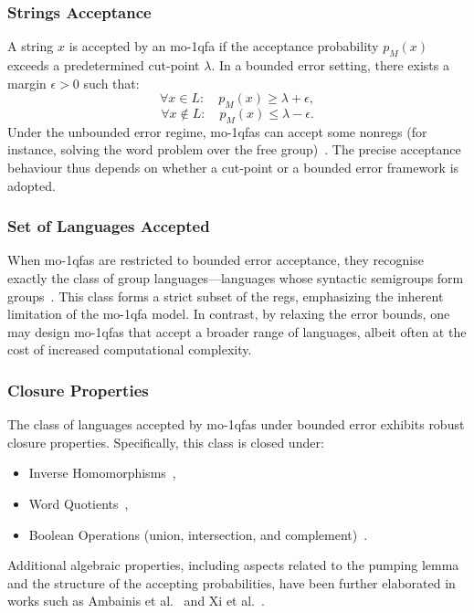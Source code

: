 \subsubsection{Strings Acceptance}
A string $x$ is accepted by an \gls{mo-1qfa} if the acceptance probability $p_M(x)$ exceeds a predetermined cut-point $\lambda$. In a bounded error setting, there exists a margin $\epsilon > 0$ such that:
\[
\forall x\in L:\quad p_M(x) \ge \lambda + \epsilon,
\]
\[
\forall x\notin L:\quad p_M(x) \le \lambda - \epsilon.
\]
Under the unbounded error regime, \glspl{mo-1qfa} can accept some non\glspl{reg} (for instance, solving the word problem over the free group)~\cite{brodsky2002characterizations}. The precise acceptance behaviour thus depends on whether a cut-point or a bounded error framework is adopted.

\subsubsection{Set of Languages Accepted}
When \glspl{mo-1qfa} are restricted to bounded error acceptance, they recognise exactly the class of group languages—languages whose syntactic semigroups form groups~\cite{brodsky2002characterizations}. This class forms a strict subset of the \glspl{reg}, emphasizing the inherent limitation of the \gls{mo-1qfa} model. In contrast, by relaxing the error bounds, one may design \glspl{mo-1qfa} that accept a broader range of languages, albeit often at the cost of increased computational complexity.

\subsubsection{Closure Properties}
The class of languages accepted by \glspl{mo-1qfa} under bounded error exhibits robust closure properties. Specifically, this class is closed under:
\begin{itemize}
    \item Inverse Homomorphisms~\cite{brodsky2002characterizations},
    \item Word Quotients~\cite{brodsky2002characterizations},
    \item Boolean Operations (union, intersection, and complement)~\cite{freivalds2005languages,bertoni2003quantum}.
\end{itemize}
Additional algebraic properties, including aspects related to the pumping lemma and the structure of the accepting probabilities, have been further elaborated in works such as Ambainis et al.~\cite{ambainis1999probabilities} and Xi et al.~\cite{xi2008some}.

